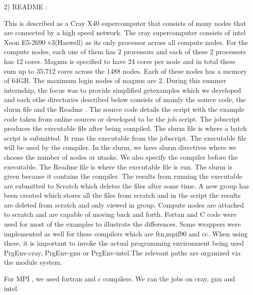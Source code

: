 \begin{Document}
{2) README :   


This is described as a Cray X40 supercomputer that consists of many nodes that are connected by a high speed network. The cray supercomputer consists of intel Xeon E5-2690 v3(Haswell) as its only processor across all compute nodes. For the compute nodes, each one of them has 2 processors and each of these 2 processors has 12 cores.
Magnus is specified to have 24 cores per node and in total these sum up to 35,712 cores across the 1488 nodes. Each of these nodes has a memory of 64GB. The maximum login nodes of magnus are 2.
During this summer internship, the focus was to provide simplified getexamples which we developed and each othe directories described below consists of mainly the source code, the slurm file and the Readme . The source code details the script with the example code taken from online sources or developed to be the job script. The jobscript produces the executable file after being compiled. The slurm file is where a batch script is submitted. It runs the executable from the jobscript. The executable file will be used by the compiler. In the slurm, we have slurm directives where we choose the number of nodes or ntasks. We also specify the compiler before the executable. The Readme file is where the executable file is run. The slurm is given because it contains the compiler. The results from running the executable are submitted to Scratch which deletes the files after some time. A new group has been created which stores all the files from scratch and in the script the results are deleted from scratch and only viewed in group. Compute nodes are attached to scratch and are capable of moving back and forth.
Fortan and C code were used for most of the examples to illustrate the differences. Some wrappers were implemented as well for these compilers which are ftn,mpif90 and cc. When using these, it is important to invoke the actual programming environment being used PrgEnv-cray, PrgEnv-gnu or PrgEnv-intel.The relevant paths are organized via the module system.




For MPI , we used fortran and c compilers. We ran the jobs on cray, gnu and intel.








}
\end{Document}
